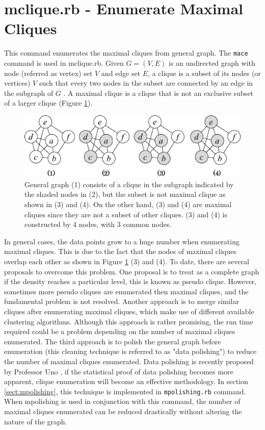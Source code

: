 
\section{mclique.rb - Enumerate Maximal Cliques\label{sect:mclique}}

This command enumerates the maximal cliques from general graph. The \verb|mace| command \cite{UnoWeb} is used in mclique.rb. 
Given $G=(V,E)$ is an undirected graph with node (referred as vertex) set $V$ and edge set $E$, 
a clique is a subset of its nodes (or vertices)  $V$ such that every two nodes in the subset are connected by an edge in the subgraph of $G$ . 
A maximal clique is a clique that is not an exclusive subset of a larger clique (Figure \ref{fig:clique}).

\begin{figure}[htbp]
\begin{center}
\includegraphics[scale=0.5]{./clique.eps}
\caption{General graph (1) consists of a clique in the subgraph indicated by the shaded nodes in (2),  but the subset is not maximal clique as shown in (3) and (4).  
On the other hand, (3) and (4) are maximal cliques since they are not a subset of other cliques. 
(3) and (4) is constructed by 4 nodes, with 3 common nodes. 
\label{fig:clique}}
\end{center}
\end{figure} 

In general cases, the data points grow to a huge number when enumerating maximal cliques. This is due to the fact that the nodes of maximal cliques overlap each other as shown in Figure \ref{fig:clique} (3) and (4). 
To date, there are  several proposals to overcome this problem. 
One proposal is to treat as a complete graph if the density reaches a particular level, this is known as pseudo clique. However, sometimes more pseudo cliques are enumerated then maximal cliques, and the fundamental problem is not resolved. 
Another approach is to merge similar cliques after enumerating maximal cliques, which make use of different available clustering algorithms. Although this approach is rather promising, the run time required could be a problem depending on the number of maximal cliques enumerated. The third approach is to polish the general graph before enumeration (this cleaning technique is referred to as "data polishing") to reduce the number of maximal cliques enumerated.  
Data polishing is recently proposed by Professor Uno \cite{Uno2014}, if the statistical proof of data polishing becomes more apparent, clique enumeration will become an effective methodology. 
In section  \ref{sect:mpolishing}, this technique is implemented in \verb|mpolishing.rb| command. When mpolishing is used in conjunction with this command, the number of maximal cliques  enumerated can be reduced drastically without altering the nature of the graph. 

